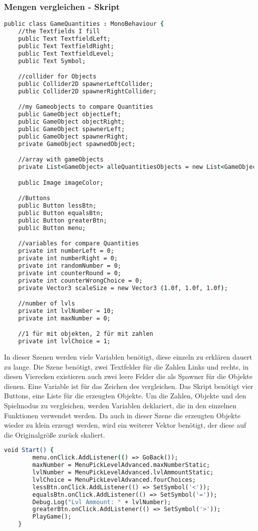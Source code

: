 \subsubsection{Mengen vergleichen - Skript}
\begin{lstlisting}[language=csh, caption={GameQuantities.cs Variablen Deklaration}]
public class GameQuantities : MonoBehaviour {
	//the Textfields I fill
	public Text TextfieldLeft;
	public Text TextfieldRight;
	public Text TextfieldLevel;
	public Text Symbol;

	//collider for Objects
	public Collider2D spawnerLeftCollider;
	public Collider2D spawnerRightCollider;

	//my Gameobjects to compare Quantities
	public GameObject objectLeft;
	public GameObject objectRight;
	public GameObject spawnerLeft;
	public GameObject spawnerRight;
	private GameObject spawnedObject;

	//array with gameObjects
	private List<GameObject> alleQuantitiesObjects = new List<GameObject>(40);

	public Image imageColor;

	//Buttons
	public Button lessBtn;
	public Button equalsBtn;
	public Button greaterBtn;
	public Button menu;

	//variables for compare Quantities
	private int numberLeft = 0;
	private int numberRight = 0;
	private int randomNumber = 0;
	private int counterRound = 0;
	private int counterWrongChoice = 0;
	private Vector3 scaleSize = new Vector3 (1.0f, 1.0f, 1.0f);

	//number of lvls
	private int lvlNumber = 10;
	private int maxNumber = 0;

	//1 für mit objekten, 2 für mit zahlen
	private int lvlChoice = 1;
\end{lstlisting}
In dieser Szenen werden viele Variablen benötigt, diese einzeln zu erklären dauert zu lange. Die Szene benötigt, zwei Textfelder für die Zahlen Links und rechts, in diesen Vierecken existieren auch zwei leere Felder die als Spawner für die Objekte dienen. Eine Variable ist für das Zeichen des vergleichen. Das Skript benötigt vier Buttons, eine Liste für die erzeugten Objekte. Um die Zahlen, Objekte und den Spielmodus zu vergleichen, werden Variablen deklariert, die in den einzelnen Funktionen verwendet werden. Da auch in dieser Szene die erzeugten Objekte wieder zu klein erzeugt werden, wird ein weiterer Vektor benötigt, der diese auf die Originalgröße zurück skaliert.\\
\begin{lstlisting}[language=csh, caption={GameQuantities.cs Start Funktion}]
	void Start() {
		menu.onClick.AddListener(() => GoBack());
		maxNumber = MenuPickLevelAdvanced.maxNumberStatic;
		lvlNumber = MenuPickLevelAdvanced.lvlAmmountStatic;
		lvlChoice = MenuPickLevelAdvanced.fourChoices;
		lessBtn.onClick.AddListener(() => SetSymbol('<'));
		equalsBtn.onClick.AddListener(() => SetSymbol('='));
		Debug.Log("Lvl Ammount: " + lvlNumber);
		greaterBtn.onClick.AddListener(() => SetSymbol('>'));
		PlayGame();
	}
\end{lstlisting}
